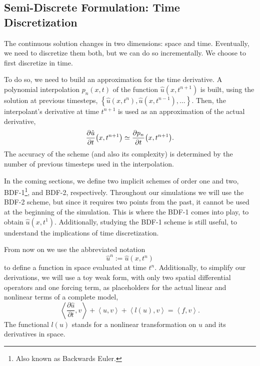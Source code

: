 \documentclass[../../thesis.tex]{subfiles}
\newcommand{\inner}[2]{\left<#1, #2\right>}
\begin{document}
\subsection{Semi-Discrete Formulation: Time Discretization}
The continuous solution changes in two dimensions: space and time.
Eventually, we need to discretize them both, but we can do so incrementally.
We choose to first discretize in time. 



To do so, we need to build an approximation for the time derivative.
A polynomial interpolation $p_n(x, t)$ of the function 
$\hat{u}(x,t^{n+1})$ is built, 
using the solution at previous timesteps, 
$\left\{\hat{u}(x,t^{n}), \hat{u}(x,t^{n-1}), \ldots\right\}$.
Then, the interpolant's derivative at time $t^{n+1}$ is used as an approximation of the actual derivative,
\begin{equation}
    \pdv{\hat{u}}{t} \qty(x, t^{n+1}) \simeq \pdv{p_n}{t} \qty(x, t^{n+1}).
\end{equation}
The accuracy of the scheme (and also its complexity) is determined by the number of previous timesteps used in the interpolation. 

In the coming sections, we define two implicit schemes of order one and two, 
BDF-1\footnote{Also known as Backwards Euler.}, and BDF-2, respectively.
Throughout our simulations we will use the BDF-2 scheme, but since it requires two points from the past, 
it cannot be used at the beginning of the simulation. 
This is where the BDF-1 comes into play, to obtain $\hat{u}(x,t^1)$.
Additionally, studying the BDF-1 scheme is still useful, to understand the implications of time discretization.

From now on we use the abbreviated notation
\begin{equation}
    \hat{u}^n := \hat{u}(x,t^n)
\end{equation}
to define a function in space evaluated at time $t^n$.
Additionally, to simplify our derivations, we will use a toy weak form,
with only two spatial differential operators and one forcing term, 
as placeholders for the actual linear and nonlinear terms of a complete model,
\begin{equation}
        \inner{\frac{\partial \hat{u}}{\partial t}}{v}
        + \inner{u}{v} 
        + \inner{l(u)}{v} 
        =  
        \inner{f}{v}.
\end{equation}
The functional $l(u)$ stands for a nonlinear transformation on $u$ and its derivatives in space.
\end{document}
